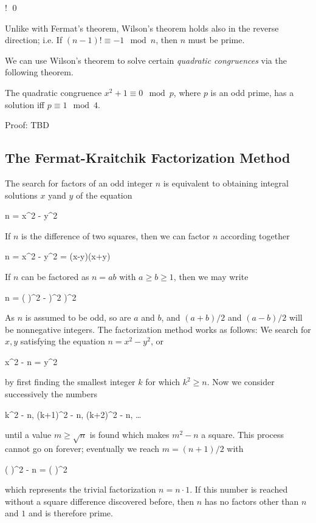 !   \qed
\eee

Unlike with Fermat's theorem, Wilson's theorem holds also in the reverse direction; i.e. If $(n-1)! \equiv -1 \mod n$, then $n$ must be prime.

We can use Wilson's theorem to solve certain \emph{quadratic congruences} via the following theorem.

\begin{theorem}
    The quadratic congruence $x^2+1 \equiv 0 \mod p$, where $p$ is an odd prime, has a solution iff $p \equiv 1 \mod 4$.
\end{theorem}

Proof: TBD

\subsection{The Fermat-Kraitchik Factorization Method}

The search for factors of an odd integer $n$ is equivalent to obtaining integral solutions $x$ yand $y$ of the equation

\bee
n = x^2 - y^2
\eee

If $n$ is the difference of two squares, then we can factor $n$ according together

\bee
n = x^2 - y^2 = (x-y)(x+y)
\eee

If $n$ can be factored as $n = ab$ with $a \geq b \geq 1$, then we may write

\bee
n = \left( )^2 - )^2 \right)^2
\eee

As $n$ is assumed to be odd, so are $a$ and $b$, and $(a+b)/2$ and $(a-b)/2$ will be nonnegative integers. The factorization method works as follows: We search for $x, y$ satisfying the equation $n = x^2 - y^2$, or

\bee
x^2 - n = y^2
\eee

by first finding the smallest integer $k$ for which $k^2 \geq n$. Now we consider successively the numbers

\bee
k^2 - n, (k+1)^2 - n, (k+2)^2 - n, \ldots
\eee

until a value $m \geq \sqrt{n}$ is found which makes $m^2 - n$ a square. This process cannot go on forever; eventually we reach $m = (n+1)/2$ with

\bee
\left(  \right)^2 - n = \left(  \right)^2
\eee

which represents the trivial factorization $n = n \cdot 1$. If this number is reached without a square difference discovered before, then $n$ has no factors other than $n$ and $1$ and is therefore prime.


